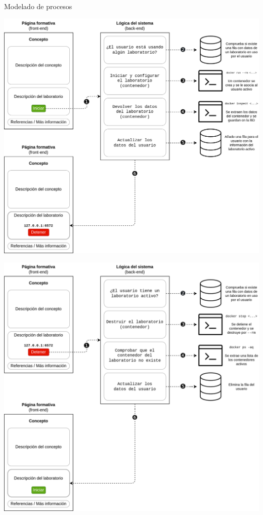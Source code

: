     \begin{frame}{Modelado de procesos}
        \centering

        \includegraphics[scale=0.09]{images/diagramas/iniciar.png}
    \end{frame}

    \begin{frame}
        \centering

        \includegraphics[scale=0.09]{images/diagramas/detener.png}
    \end{frame}

